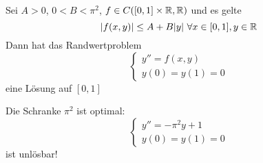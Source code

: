 \documentclass{article}
\begin{document}
\begin{satz}
Sei $A>0$, $0<B<\pi^2$, $f\in C([0,1]\times \mathbb{R}, \mathbb{R})$ und es gelte
\[|f(x,y)|\le A+ B|y| \ \forall x\in[0,1], y\in\mathbb{R}\]
Dann hat das Randwertproblem
\[ \begin{cases} y'' = f(x,y) \\ y(0) = y(1) = 0 \end{cases} \]
eine Lösung auf $[0,1]$
\end{satz}

\begin{bemerkung}
Die Schranke $\pi^2$ ist optimal:
\[ \begin{cases} y'' = -\pi^2y + 1 \\ y(0) = y(1) = 0 \end{cases} \]
ist unlösbar!
\end{bemerkung}
\end{document}
